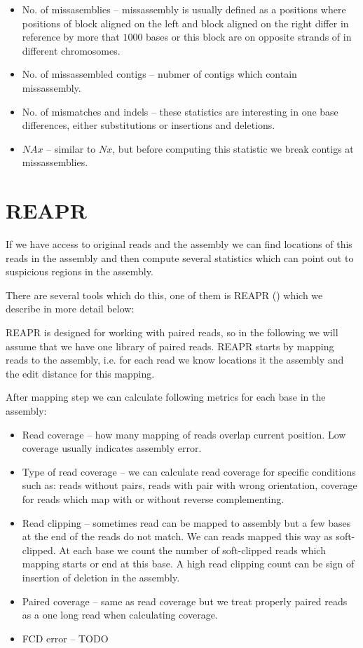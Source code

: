 \begin{itemize}
\item No. of missasemblies -- missassembly is usually defined as a positions where
positions of block aligned on the left and block aligned on the right differ in reference
by more that $1000$ bases or this block are on opposite strands of in different chromosomes.
\item No. of missassembled contigs -- nubmer of contigs which contain missassembly.
\item No. of mismatches and indels -- these statistics are interesting in one base differences,
either substitutions or insertions and deletions.
\item $NAx$ -- similar to $Nx$, but before computing this statistic we break
contigs at missassemblies.
\end{itemize}

\section{REAPR}

If we have access to original reads and the assembly we can find locations
of this reads in the assembly and then compute several statistics which
can point out to suspicious regions in the assembly.

There are several tools which do this, one of them is REAPR (\cite{Reapr}) which we describe
in more detail below:

REAPR is designed for working with paired reads, so in the following we will assume that
we have one library of paired reads. REAPR starts by mapping reads to the assembly, i.e. for each read we know locations it the assembly
and the edit distance for this mapping.

After mapping step we can calculate following metrics for each base in the assembly:
\begin{itemize}
\item Read coverage -- how many mapping of reads overlap current position. Low coverage usually indicates assembly error.
\item Type of read coverage -- we can calculate read coverage for specific conditions such as: reads without pairs, reads with pair with wrong orientation,
coverage for reads which map with or without reverse complementing.
\item Read clipping -- sometimes read can be mapped to assembly but a few bases at the end of the reads do not match. We can reads mapped this way as soft-clipped.
At each base we count the number of soft-clipped reads which mapping starts or end at this base. A high read clipping count can be sign of insertion of deletion
in the assembly.
\item Paired coverage -- same as read coverage but we treat properly paired reads as a one long read when calculating coverage.
\item FCD error -- TODO
\end{itemize}

